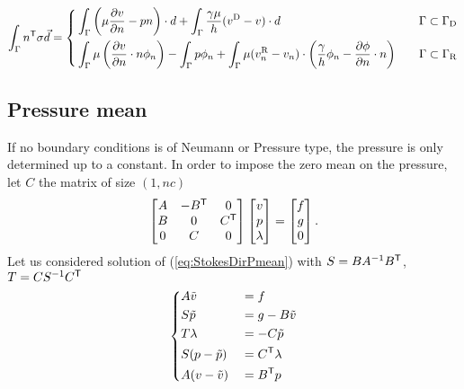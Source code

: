 %
%
\begin{equation}\label{eq:}
%
\int_{\Gamma} \transpose{n}\sigma \vec{d} =
\left\{
\begin{aligned}
& 
 \int_{\Gamma} \left(  \mu\dn{v} -p n  \right)\cdot  d
+\int_{\Gamma}\frac{\gamma\mu}{h}(\vD-v)\cdot d
&\quad \Gamma\subset\GammaD\\ 
& 
 \int_{\Gamma} \mu\left( \dn{v}\cdot n \phi_n \right)
- \int_{\Gamma} p\phi_n  
+\int_{\Gamma}\mu(\vRn-v_n)\cdot\left( \frac{\gamma}{h}\phi_n - \dn{\phi}\cdot n\right)
&\quad \Gamma\subset\GammaR
\end{aligned}
\right.
%
\end{equation}
% 
%
\subsection{Pressure mean}\label{subsec:}
%
If no boundary conditions is of Neumann or Pressure type, the pressure is only determined up to a constant. In order to impose the zero mean on the pressure, let $C$ the matrix of size $(1,nc)$
%
\begin{equation}\label{eq:StokesDirPmean}
\begin{bmatrix}
A  & -{B}^{\mathsf{T}}& 0\\
B & 0 & {C}^{\mathsf{T}}\\
0 & C & 0
\end{bmatrix}
\begin{bmatrix}
v\\
p\\
\lambda
\end{bmatrix}
=
\begin{bmatrix}
f\\
g\\
0
\end{bmatrix}.
\end{equation}
%
Let us considered solution of (\ref{eq:StokesDirPmean}) with $S=BA^{-1}{B}^{\mathsf{T}}$, $T=CS^{-1}{C}^{\mathsf{T}}$
%
\begin{equation}\label{eq:}
%
\left\{
\begin{aligned}
&A \tilde v &&= f\\
&S \tilde p &&= g-B\tilde v\\
&T \lambda &&= -C\tilde p\\
&S (p-\tilde p) &&= \transpose{C} \lambda\\
&A(v-\tilde v) &&=  \transpose{B} p
\end{aligned}
\right.
%
\end{equation}
%
%
